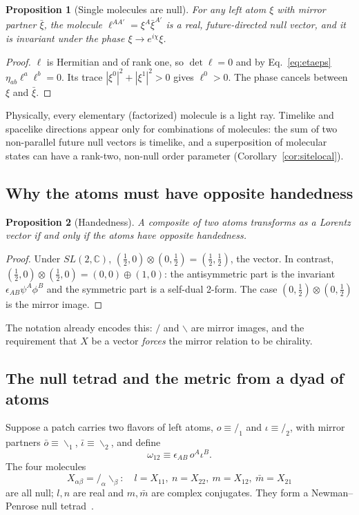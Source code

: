 \documentclass[reprint,aps,prd,amsmath,amssymb,superscriptaddress,nofootinbib,floatfix]{revtex4-2}
\theoremstyle{plain}
\newtheorem{proposition}{Proposition}
\theoremstyle{definition}
\theoremstyle{remark}
\newcommand{\Lat}{\ensuremath{/}}                 %
\newcommand{\Rat}{\ensuremath{\backslash}}        %
\newcommand{\Mol}{\ensuremath{X}}                 %
\newcommand{\SLC}{SL(2,\mathbb{C})}
\begin{document}
\begin{proposition}[Single molecules are null]
\label{prop:null}
For any left atom $\xi$ with mirror partner $\bar\xi$, the molecule $\ell^{AA'}=\xi^A\bar\xi^{A'}$ is a real,
future-directed null vector, and it is invariant under the phase $\xi\to e^{i\chi}\xi$.
\end{proposition}
\begin{proof}
$\ell$ is Hermitian and of rank one, so $\det\ell=0$ and by Eq.~\eqref{eq:etaeps}
$\eta_{ab}\ell^a\ell^b=0$. Its trace $|\xi^0|^2+|\xi^1|^2>0$ gives $\ell^0>0$. The phase cancels between
$\xi$ and $\bar\xi$.
\end{proof}
Physically, every elementary (factorized) molecule is a light ray. Timelike and spacelike directions appear only for
combinations of molecules: the sum of two non-parallel future null vectors is timelike, and a superposition of molecular
states can have a rank-two, non-null order parameter (Corollary~\ref{cor:sitelocal}).

\subsection{Why the atoms must have opposite handedness}

\begin{proposition}[Handedness]
\label{prop:handedness}
A composite of two atoms transforms as a Lorentz vector if and only if the atoms have opposite handedness.
\end{proposition}
\begin{proof}
Under $\SLC$, $(\tfrac12,0)\otimes(0,\tfrac12)=(\tfrac12,\tfrac12)$, the vector. In contrast,
$(\tfrac12,0)\otimes(\tfrac12,0)=(0,0)\oplus(1,0)$: the antisymmetric part is the invariant
$\epsilon_{AB}\psi^A\phi^B$ and the symmetric part is a self-dual 2-form. The case $(0,\tfrac12)\otimes(0,\tfrac12)$ is the
mirror image.
\end{proof}

The notation already encodes this: $\Lat$ and $\Rat$ are mirror images, and the requirement that $\Mol$ be a
vector \emph{forces} the mirror relation to be chirality.

\subsection{The null tetrad and the metric from a dyad of atoms}

Suppose a patch carries two flavors of left atoms, $o\equiv\Lat_1$ and $\iota\equiv\Lat_2$, with mirror
partners $\bar o\equiv\Rat_1$, $\bar\iota\equiv\Rat_2$, and define
\begin{equation}
\omega_{12}\equiv\epsilon_{AB}\,o^A\iota^B .
\label{eq:omega12}
\end{equation}
The four molecules
\begin{equation}
\Mol_{\alpha\beta}=\Lat_\alpha\Rat_\beta:\quad
l=\Mol_{11},\ n=\Mol_{22},\ m=\Mol_{12},\ \bar m=\Mol_{21}
\label{eq:tetrad}
\end{equation}
are all null; $l,n$ are real and $m,\bar m$ are complex conjugates. They form a Newman--Penrose null
tetrad~\cite{NewmanPenrose1962}.
\end{document}
